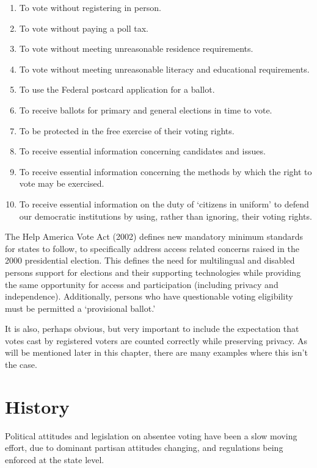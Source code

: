 \begin{enumerate}
  \item To vote without registering in person.
  \item To vote without paying a poll tax.
  \item To vote without meeting unreasonable residence requirements.
  \item To vote without meeting unreasonable literacy and educational
    requirements.
  \item To use the Federal postcard application for a ballot.
  \item To receive ballots for primary and general elections in time to vote.
  \item To be protected in the free exercise of their voting rights.
  \item To receive essential information concerning candidates and issues.
  \item To receive essential information concerning the methods by which the
    right to vote may be exercised.
  \item To receive essential information on the duty of `citizens in uniform'
    to defend our democratic institutions by using, rather than ignoring, their
    voting rights.
\end{enumerate}

The Help America Vote Act (2002) defines new mandatory minimum standards for
states to follow, to specifically address access related concerns raised in the
2000 presidential election. This defines the need for multilingual and disabled
persons support for elections and their supporting technologies while providing
the same opportunity for access and participation (including privacy and
independence). Additionally, persons who have questionable voting eligibility
must be permitted a `provisional ballot.' 

It is also, perhaps obvious, but very important to include the expectation that
votes cast by registered voters are counted correctly while preserving privacy.
As will be mentioned later in this chapter, there are many examples where this
isn't the case.


\section{History}
Political attitudes and legislation on absentee voting have been a slow moving
effort, due to dominant partisan attitudes changing, and regulations being
enforced at the state level.

